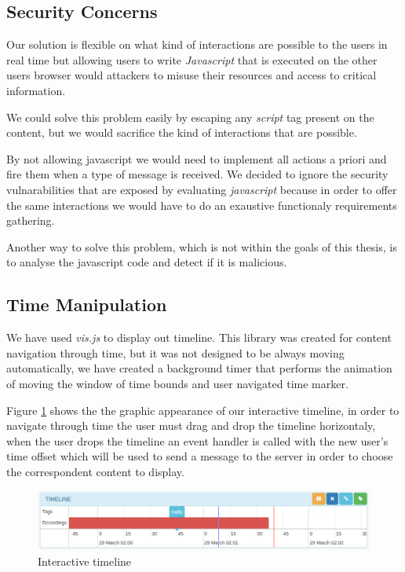 	\subsection{Security Concerns}

	Our solution is flexible on what kind of interactions are possible to the users in real time but allowing users to write \emph{Javascript} that is executed on the other users browser would attackers to misuse their resources and access to critical information.

	We could solve this problem easily by escaping any \emph{script} tag present on the content, but we would sacrifice the kind of interactions that are possible. 

	By not allowing javascript we would need to implement all actions a priori and fire them when a type of message is received. We decided to ignore the security vulnarabilities that are exposed by evaluating \emph{javascript} because in order to offer the same interactions we would have to do an exaustive functionaly requirements gathering.

	Another way to solve this problem, which is not within the goals of this thesis, is to analyse the javascript code and detect if it is malicious.

	\subsection{Time Manipulation}

	We have used \emph{vis.js} to display out timeline. This library was created for content navigation through time, but it was not designed to be always moving automatically, we have created a background timer that performs the animation of moving the window of time bounds and user navigated time marker.

	Figure \ref{fig:timeline} shows the the graphic appearance of our interactive timeline, in order to navigate through time the user must drag and drop the timeline horizontaly, when the user drops the timeline an event handler is called with the new user's time offset which will be used to send a message to the server in order to choose the correspondent content to display. 

	\begin{figure}[!htb]
		\centering
		\includegraphics[width=\textwidth]{figures/timeline.png}
		\caption{Interactive timeline}
		\label{fig:timeline}
	\end{figure}

